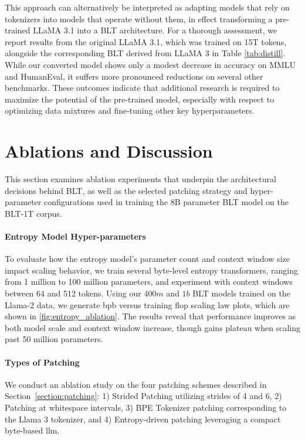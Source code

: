 This approach can alternatively be interpreted as adapting models that rely on tokenizers into models that operate without them, in effect transforming a pre-trained LLaMA 3.1 into a {\textsc BLT} architecture. For a thorough assessment, we report results from the original LLaMA 3.1, which was trained on 15T tokens, alongside the corresponding {\textsc BLT} derived from LLaMA 3 in Table \ref{tab:distill}. While our converted model shows only a modest decrease in accuracy on MMLU and HumanEval, it suffers more pronounced reductions on several other benchmarks. These outcomes indicate that additional research is required to maximize the potential of the pre-trained model, especially with respect to optimizing data mixtures and fine-tuning other key hyperparameters.

\section{Ablations and Discussion}
\label{section:ablations}
This section examines ablation experiments that underpin the architectural decisions behind {\textsc BLT}, as well as the selected patching strategy and hyper-parameter configurations used in training the 8B parameter {\textsc BLT} model on the {\textsc BLT}-1T corpus.

\paragraph{Entropy Model Hyper-parameters} To evaluate how the entropy model’s parameter count and context window size impact scaling behavior, we train several byte-level entropy transformers, ranging from 1 million to 100 million parameters, and experiment with context windows between 64 and 512 tokens. Using our $400m$ and $1b$ {\textsc BLT} models trained on the Llama-2 data, we generate bpb versus training flop scaling law plots, which are shown in \autoref{fig:entropy_ablation}. The results reveal that performance improves as both model scale and context window increase, though gains plateau when scaling past 50 million parameters.

\paragraph{Types of Patching}

We conduct an ablation study on the four patching schemes described in Section~\ref{section:patching}: 1) Strided Patching utilizing strides of 4 and 6, 2) Patching at whitespace intervals, 3) BPE Tokenizer patching corresponding to the Llama 3 tokenizer, and 4) Entropy-driven patching leveraging a compact byte-based llm.

